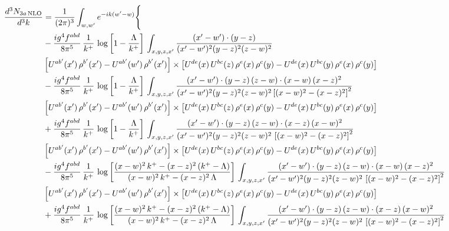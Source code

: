 \documentclass[9pt]{article}
\numberwithin{equation}{section}
\begin{document}
\begin{align}
\frac{d^{3}N_{3a\,\rm NLO}}{d^{3}k} & =\frac{1}{(2\pi)^{3}}\int_{w,w'}e^{-ik(w'-w)}\Bigg\{\notag \\ &  -\frac{ig^{4}f^{abd}}{8\pi^{5}}\,\frac{1}{k^{+}}\, \log{\left[1-\frac{\Lambda}{k^{+}}\right]}\,\int_{x,y,z,x'}
\frac{(x'-w')\cdot(y-z)}{(x'-w')^{2}(y-z)^{2}(z-w)^{2}}\notag \\ & \left[U^{ab'}(x')\,\rho^{b'}(x')-U^{ab'}(w')\, \rho^{b'}(x')\right]\times \left[U^{de}(x)\,U^{bc}(z)\, \rho^{e}(x)\,\rho^{c}(y)-U^{de}(x)\,U^{bc}(y)\,\rho^{e}(x)\,\rho^{c}(y)\right]\notag \\ & -\frac{ig^{4}f^{abd}}{8\pi^{5}}\,\frac{1}{k^{+}}\, \log{\left[1-\frac{\Lambda}{k^{+}}\right]}\,\int_{x,y,z,x'}
\frac{(x'-w')\cdot(y-z)\,(z-w)\cdot(x-w)\,(x-z)^{2}}{(x'-w')^{2}(y-z)^{2}(z-w)^{2}\left[(x-w)^{2}-(x-z)^{2}\right]^{2}}\notag \\ & \left[U^{ab'}(x')\,\rho^{b'}(x')-U^{ab'}(w')\, \rho^{b'}(x')\right]\times \left[U^{de}(x)\,U^{bc}(z)\, \rho^{e}(x)\,\rho^{c}(y)-U^{de}(x)\,U^{bc}(y)\,\rho^{e}(x)\,\rho^{c}(y)\right]\notag \\ & +\frac{ig^{4}f^{abd}}{8\pi^{5}}\,\frac{1}{k^{+}}\, \log{\left[1-\frac{\Lambda}{k^{+}}\right]}\,\int_{x,y,z,x'}
\frac{(x'-w')\cdot(y-z)\,(z-w)\cdot(x-z)\,(x-w)^{2}}{(x'-w')^{2}(y-z)^{2}(z-w)^{2}\,\left[(x-w)^{2}-(x-z)^{2}\right]^{2}}\notag \\ & \left[U^{ab'}(x')\,\rho^{b'}(x')-U^{ab'}(w')\, \rho^{b'}(x')\right]\times \left[U^{de}(x)\,U^{bc}(z)\, \rho^{e}(x)\,\rho^{c}(y)-U^{de}(x)\,U^{bc}(y)\,\rho^{e}(x)\,\rho^{c}(y)\right]\notag \\ & 
-\frac{ig^{4}f^{abd}}{8\pi^{5}}\,\frac{1}{k^{+}}\,\log{\left[\frac{(x-w)^{2}\,k^{+}-(x-z)^{2}\,(k^{+}-\Lambda)}{(x-w)^{2}\,k^{+}-(x-z)^{2}\,\Lambda}\right]}\,\int_{x,y,z,x'}
\frac{(x'-w')\cdot(y-z)\,(z-w)\cdot(x-w)\,(x-z)^{2}}{(x'-w')^{2}(y-z)^{2}(z-w)^{2}\,\left[(x-w)^{2}-(x-z)^{2}\right]^{2}}\notag \\ & \left[U^{ab'}(x')\,\rho^{b'}(x')-U^{ab'}(w')\, \rho^{b'}(x')\right]\times \left[U^{de}(x)\,U^{bc}(z)\, \rho^{e}(x)\,\rho^{c}(y)-U^{de}(x)\,U^{bc}(y)\,\rho^{e}(x)\,\rho^{c}(y)\right]\notag \\ & +\frac{ig^{4}f^{abd}}{8\pi^{5}}\,\frac{1}{k^{+}}\,\log{\left[\frac{(x-w)^{2}\,k^{+}-(x-z)^{2}\,(k^{+}-\Lambda)}{(x-w)^{2}\,k^{+}-(x-z)^{2}\,\Lambda}\right]}\,\int_{x,y,z,x'}
\frac{(x'-w')\cdot(y-z)\,(z-w)\cdot(x-z)\,(x-w)^{2}}{(x'-w')^{2}(y-z)^{2}(z-w)^{2}\,\left[(x-w)^{2}-(x-z)^{2}\right]^{2}}\notag \\ 

\end{align}
\end{document}
